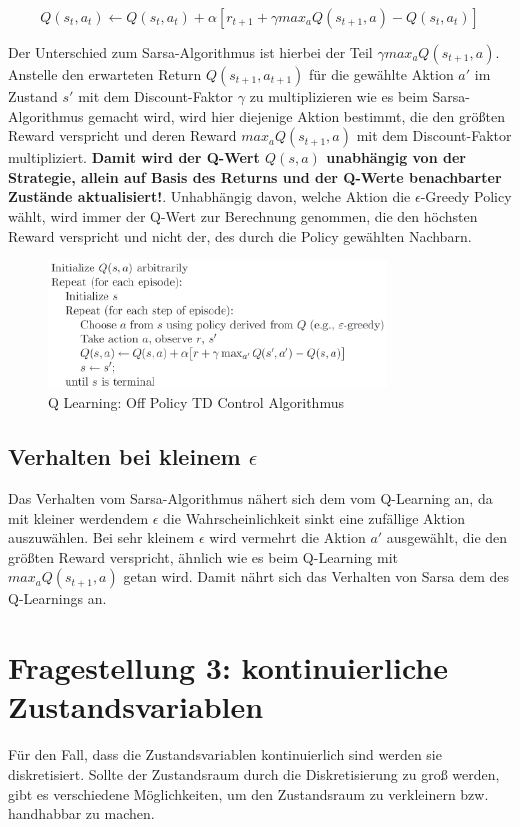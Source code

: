 \documentclass[10pt]{scrartcl}
\begin{document}
\begin{equation}
Q(s_{t},a_{t}) \leftarrow Q(s_{t},a_{t}) + \alpha [r_{t+1} + \gamma max_{a} Q(s_{t+1},a) - Q(s_{t},a_{t})]
\end{equation} 

Der Unterschied zum Sarsa-Algorithmus ist hierbei der Teil $\gamma max_{a} Q(s_{t+1},a)$. Anstelle den erwarteten Return $Q(s_{t+1},a_{t+1})$ für die gewählte Aktion $a'$ im Zustand $s'$ mit dem Discount-Faktor $\gamma$ zu multiplizieren wie es beim Sarsa-Algorithmus gemacht wird, wird hier diejenige Aktion bestimmt, die den größten Reward verspricht und deren Reward $max_{a} Q(s_{t+1},a)$ mit dem Discount-Faktor multipliziert. \textbf{Damit wird der Q-Wert $Q(s,a)$ unabhängig von der Strategie, allein auf Basis des Returns und der Q-Werte benachbarter Zustände aktualisiert!}. 
Unhabhängig davon, welche Aktion die $\epsilon$-Greedy Policy wählt, wird immer der Q-Wert zur Berechnung genommen, die den höchsten Reward verspricht und nicht der, des durch die Policy gewählten Nachbarn. 

\begin{figure}[htbp]
	\centering	\includegraphics[width=0.8\textwidth]{Bilder/Q-Learning.png}
	\caption{Q Learning: Off Policy TD Control Algorithmus}
	\label{fig:QLearning}
\end{figure}


\subsection{Verhalten bei kleinem $\epsilon$}
Das Verhalten vom Sarsa-Algorithmus nähert sich dem vom Q-Learning an, da mit kleiner werdendem $\epsilon$ die Wahrscheinlichkeit sinkt eine zufällige Aktion auszuwählen. Bei sehr kleinem $\epsilon$ wird vermehrt die Aktion $a'$ ausgewählt, die den größten Reward verspricht, ähnlich wie es beim Q-Learning mit $max_{a} Q(s_{t+1},a)$ getan wird. Damit nährt sich das Verhalten von Sarsa dem des Q-Learnings an.

\section{Fragestellung 3: kontinuierliche Zustandsvariablen}
Für den Fall, dass die Zustandsvariablen kontinuierlich sind werden sie diskretisiert. Sollte der Zustandsraum durch die Diskretisierung zu groß werden, gibt es verschiedene Möglichkeiten, um den Zustandsraum zu verkleinern bzw. handhabbar zu machen.
\end{document}
